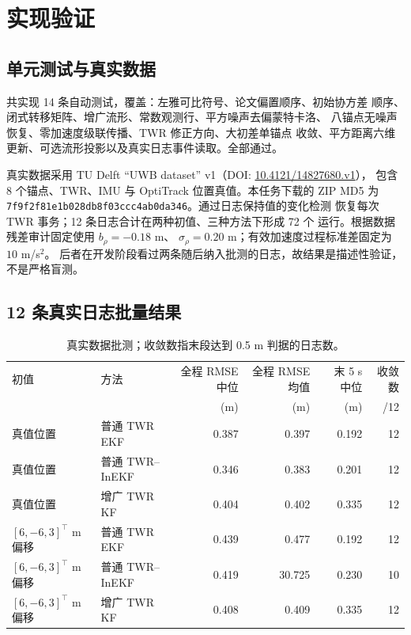 \documentclass[11pt,a4paper]{ctexart}
\begin{document}
\section{实现验证}

\subsection{单元测试与真实数据}

共实现 14 条自动测试，覆盖：左雅可比符号、论文偏置顺序、初始协方差
顺序、闭式转移矩阵、增广流形、常数观测行、平方噪声去偏蒙特卡洛、
八锚点无噪声恢复、零加速度级联传播、TWR 修正方向、大初差单锚点
收敛、平方距离六维更新、可选流形投影以及真实日志事件读取。全部通过。

真实数据采用 TU Delft ``UWB dataset'' v1（DOI:
\href{https://doi.org/10.4121/14827680.v1}{10.4121/14827680.v1}），
包含 8 个锚点、TWR、IMU 与 OptiTrack 位置真值。本任务下载的 ZIP
MD5 为
\texttt{7f9f2f81e1b028db8f03ccc4ab0da346}。通过日志保持值的变化检测
恢复每次 TWR 事务；12 条日志合计在两种初值、三种方法下形成 72 个
运行。根据数据残差审计固定使用 $b_\rho=-0.18$ m、
$\sigma_\rho=0.20$ m；有效加速度过程标准差固定为 $10$ m/s$^2$。
后者在开发阶段看过两条随后纳入批测的日志，故结果是描述性验证，
不是严格盲测。

\subsection{12 条真实日志批量结果}

\begin{table}[H]
\centering
\small
\caption{真实数据批测；收敛数指末段达到 0.5 m 判据的日志数。}
\begin{tabular}{llrrrr}
\toprule
初值 & 方法 & 全程 RMSE 中位 & 全程 RMSE 均值 &
末 5 s 中位 & 收敛数\\
 & & (m) & (m) & (m) & /12\\
\midrule
真值位置 & 普通 TWR EKF & 0.387 & 0.397 & 0.192 & 12\\
真值位置 & 普通 TWR--InEKF & 0.346 & 0.383 & 0.201 & 12\\
真值位置 & 增广 TWR KF   & 0.404 & 0.402 & 0.335 & 12\\
$[6,-6,3]^\top$ m 偏移 & 普通 TWR EKF & 0.439 & 0.477 & 0.192 & 12\\
$[6,-6,3]^\top$ m 偏移 & 普通 TWR--InEKF & 0.419 & 30.725 & 0.230 & 10\\
$[6,-6,3]^\top$ m 偏移 & 增广 TWR KF   & 0.408 & 0.409 & 0.335 & 12\\
\bottomrule
\end{tabular}
\label{tab:real-batch}
\end{table}
\end{document}
